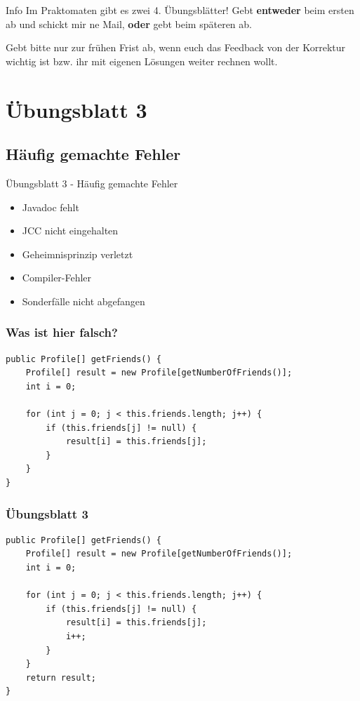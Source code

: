 \documentclass[18pt]{beamer}
\begin{document}
\begin{frame}{Info}
	Im Praktomaten gibt es zwei 4. Übungsblätter!
	Gebt \textbf{entweder} beim ersten ab und schickt mir ne Mail, \textbf{oder} gebt beim späteren ab.
	

	Gebt bitte nur zur frühen Frist ab, wenn euch das Feedback von der Korrektur wichtig ist bzw. ihr mit eigenen Lösungen weiter rechnen wollt.
\end{frame}


\section{Übungsblatt 3}
\subsection{Häufig gemachte Fehler}
\begin{frame}{Übungsblatt 3 - Häufig gemachte Fehler}
	\begin{itemize}
		\item Javadoc fehlt
		\item JCC nicht eingehalten \pause
		\item Geheimnisprinzip verletzt \pause
		\item Compiler-Fehler \pause
		\item Sonderfälle nicht abgefangen
	\end{itemize}
\end{frame}


\begin{frame}[containsverbatim]
	\frametitle{Was ist hier falsch?}
	\begin{lstlisting}
public Profile[] getFriends() {
	Profile[] result = new Profile[getNumberOfFriends()];
	int i = 0;
		
	for (int j = 0; j < this.friends.length; j++) {
		if (this.friends[j] != null) {
			result[i] = this.friends[j];
		}
	}
}
	\end{lstlisting}
\end{frame}


\begin{frame}[containsverbatim]
	\frametitle{Übungsblatt 3}
	\begin{lstlisting}
public Profile[] getFriends() {
	Profile[] result = new Profile[getNumberOfFriends()];
	int i = 0;
		
	for (int j = 0; j < this.friends.length; j++) {
		if (this.friends[j] != null) {
			result[i] = this.friends[j];
			i++;
		}
	}
	return result;
}
	\end{lstlisting}
\end{frame}
\end{document}
